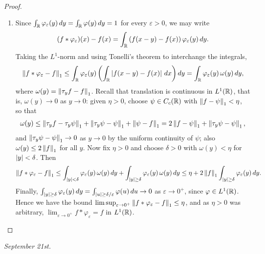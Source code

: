 \begin{proof}
\begin{enumerate}
        \item Since $\int_{\mathbb{R}} \varphi_{\varepsilon}(y) \, dy = \int_{\mathbb{R}} \varphi(y) \, dy = 1$ for every $\varepsilon > 0$, we may write
        \begin{align}
            (f \ast \varphi_{\varepsilon})(x) - f(x) = \int_{\mathbb{R}} \left(f(x-y)-f(x)\right)\varphi_{\varepsilon}(y) \, dy.
        \end{align}
        Taking the $L^{1}$-norm and using Tonelli's theorem to interchange the integrals,
        \begin{align}
            \left\lVert f \ast \varphi_{\varepsilon} - f\right\rVert_{1} \leq \int_{\mathbb{R}} \varphi_{\varepsilon}(y) \left(\int_{\mathbb{R}} \left| f(x-y)-f(x) \right| \, dx\right) dy = \int_{\mathbb{R}} \varphi_{\varepsilon}(y)\, \omega(y) \, dy,
        \end{align}
        where $\omega(y) = \left\lVert\tau_{y}f - f\right\rVert_{1}$. Recall that translation is continuous in $L^{1}(\mathbb{R})$, that is, $\omega(y) \to 0$ as $y \to 0$: given $\eta > 0$, choose $\psi \in C_{c}(\mathbb{R})$ with $\left\lVert f-\psi\right\rVert_{1} < \eta$, so that
        \begin{align}
            \omega(y) \leq \left\lVert\tau_{y}f - \tau_{y}\psi\right\rVert_{1} + \left\lVert\tau_{y}\psi - \psi\right\rVert_{1} + \left\lVert\psi - f\right\rVert_{1} = 2\left\lVert f-\psi\right\rVert_{1} + \left\lVert\tau_{y}\psi - \psi\right\rVert_{1},
        \end{align}
        and $\left\lVert\tau_{y}\psi - \psi\right\rVert_{1} \to 0$ as $y \to 0$ by the uniform continuity of $\psi$; also $\omega(y) \leq 2\left\lVert f\right\rVert_{1}$ for all $y$. Now fix $\eta > 0$ and choose $\delta > 0$ with $\omega(y) < \eta$ for $\left| y \right| < \delta$. Then
        \begin{align}
            \left\lVert f \ast \varphi_{\varepsilon} - f\right\rVert_{1} \leq \int_{\left| y \right| < \delta} \varphi_{\varepsilon}(y)\, \omega(y) \, dy + \int_{\left| y \right| \geq \delta} \varphi_{\varepsilon}(y)\, \omega(y) \, dy \leq \eta + 2\left\lVert f\right\rVert_{1} \int_{\left| y \right| \geq \delta} \varphi_{\varepsilon}(y) \, dy.
        \end{align}
        Finally, $\int_{\left| y \right| \geq \delta} \varphi_{\varepsilon}(y) \, dy = \int_{\left| u \right| \geq \delta/\varepsilon} \varphi(u) \, du \to 0$ as $\varepsilon \to 0^{+}$, since $\varphi \in L^{1}(\mathbb{R})$. Hence we have the bound $\limsup_{\varepsilon \to 0^{+}} \left\lVert f \ast \varphi_{\varepsilon} - f\right\rVert_{1} \leq \eta$, and as $\eta > 0$ was arbitrary, $\lim_{\varepsilon \to 0^{+}} f \ast \varphi_{\varepsilon} = f$ in $L^{1}(\mathbb{R})$.
    \end{enumerate}
\end{proof}

\textit{September 21st.}

